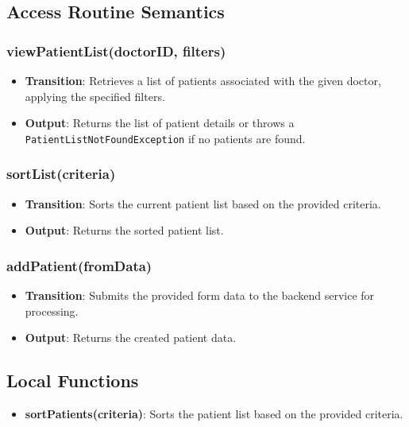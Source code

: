 \documentclass[12pt, titlepage]{article}
\begin{document}
\subsection{Access Routine Semantics}
\subsubsection{viewPatientList(doctorID, filters)}

\begin{itemize}
    \item \textbf{Transition}: Retrieves a list of patients associated with the given doctor, applying the specified filters.
    \item \textbf{Output}: Returns the list of patient details or throws a \texttt{PatientListNotFoundException} if no patients are found.
\end{itemize}

\subsubsection{sortList(criteria)}

\begin{itemize}
    \item \textbf{Transition}: Sorts the current patient list based on the provided criteria.
    \item \textbf{Output}: Returns the sorted patient list.
\end{itemize}

\subsubsection{addPatient(fromData)}
\begin{itemize}
    \item \textbf{Transition}: Submits the provided form data to the backend service for processing.
    \item \textbf{Output}: Returns the created patient data.
\end{itemize}

\subsection{Local Functions}
\begin{itemize}
\item \textbf{sortPatients(criteria)}: Sorts the patient list based on the provided criteria.
\end{itemize}
\end{document}
